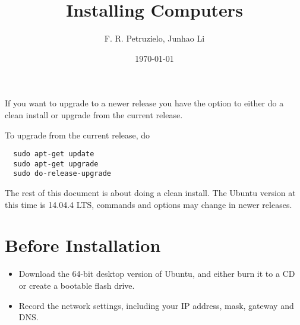 \documentclass[12pt]{article}
\title{Installing Computers}
\author{F. R. Petruzielo, Junhao Li}
\date{\today}
\begin{document}
\maketitle

If you want to upgrade to a newer release you have the option to either do a clean install or upgrade from the current release.

To upgrade from the current release, do
\begin{Verbatim}
  sudo apt-get update
  sudo apt-get upgrade
  sudo do-release-upgrade
\end{Verbatim}

The rest of this document is about doing a clean install.
The Ubuntu version at this time is 14.04.4 LTS, commands and options may change in newer releases.

\section{Before Installation}
\begin{itemize}
\item Download the 64-bit desktop version of Ubuntu, and either burn it to a CD or create a bootable flash drive.
\item Record the network settings, including your IP address, mask, gateway and DNS.
\end{itemize}
\end{document}
